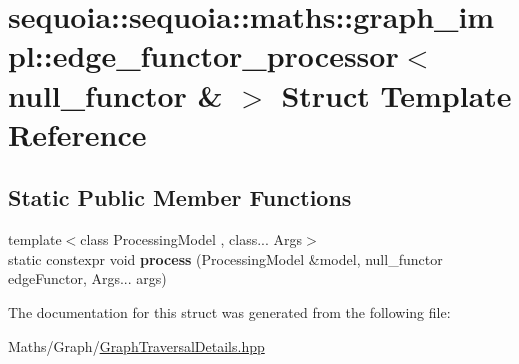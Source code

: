 \hypertarget{structsequoia_1_1sequoia_1_1maths_1_1graph__impl_1_1edge__functor__processor_3_01null__functor_01_6_01_4}{}\section{sequoia\+::sequoia\+::maths\+::graph\+\_\+impl\+::edge\+\_\+functor\+\_\+processor$<$ null\+\_\+functor \& $>$ Struct Template Reference}
\label{structsequoia_1_1sequoia_1_1maths_1_1graph__impl_1_1edge__functor__processor_3_01null__functor_01_6_01_4}
\subsection*{Static Public Member Functions}
\begin{DoxyCompactItemize}
\item 
\mbox{\label{structsequoia_1_1sequoia_1_1maths_1_1graph__impl_1_1edge__functor__processor_3_01null__functor_01_6_01_4_aa8db710b4bf1c63d1460d6e6020a137c}} 
{\footnotesize template$<$class Processing\+Model , class... Args$>$ }\\static constexpr void {\bfseries process} (Processing\+Model \&model, null\+\_\+functor edge\+Functor, Args... args)
\end{DoxyCompactItemize}


The documentation for this struct was generated from the following file\+:\begin{DoxyCompactItemize}
\item 
Maths/\+Graph/\mbox{\hyperlink{_graph_traversal_details_8hpp}{Graph\+Traversal\+Details.\+hpp}}\end{DoxyCompactItemize}
